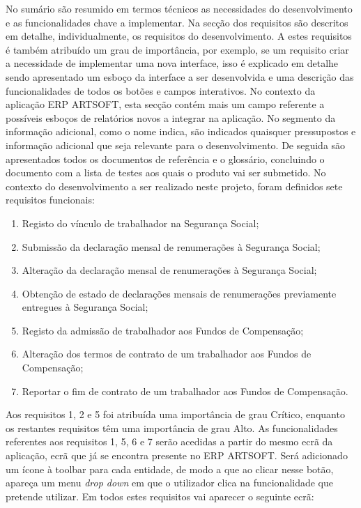 \documentclass[sigplan]{acmart}
\begin{document}
No sumário são resumido em termos técnicos as necessidades do desenvolvimento e as funcionalidades chave a implementar. Na secção dos requisitos são descritos em detalhe, individualmente, os requisitos do desenvolvimento. A estes requisitos é também atribuído um grau de importância, por exemplo, se um requisito criar a necessidade de implementar uma nova interface, isso é explicado em detalhe sendo apresentado um esboço da interface a ser desenvolvida e uma descrição das funcionalidades de todos os botões e campos interativos. No contexto da aplicação ERP ARTSOFT, esta secção contém mais um campo referente a possíveis esboços de relatórios novos a integrar na aplicação. No segmento da informação adicional, como o nome indica, são indicados quaisquer pressupostos e informação adicional que seja relevante para o desenvolvimento. De seguida são apresentados todos os documentos de referência e o glossário, concluindo o documento com a lista de testes aos quais o produto vai ser submetido. No contexto do desenvolvimento a ser realizado neste projeto, foram definidos sete requisitos funcionais:
\begin{enumerate}
  \item Registo do vínculo de trabalhador na Segurança Social;
  \item Submissão da declaração mensal de renumerações à Segurança Social;
  \item Alteração da declaração mensal de renumerações à Segurança Social;
  \item Obtenção de estado de declarações mensais de renumerações previamente entregues à Segurança Social;
  \item Registo da admissão de trabalhador aos Fundos de Compensação;
  \item Alteração dos termos de contrato de um trabalhador aos Fundos de Compensação;
  \item Reportar o fim de contrato de um trabalhador aos Fundos de Compensação.
\end{enumerate}
Aos requisitos 1, 2 e 5 foi atribuída uma importância de grau Crítico, enquanto os restantes requisitos têm uma importância de grau Alto. As funcionalidades referentes aos requisitos 1, 5, 6 e 7 serão acedidas a partir do mesmo ecrã da aplicação, ecrã que já se encontra presente no ERP ARTSOFT. Será adicionado um ícone à toolbar para cada entidade, de modo a que ao clicar nesse botão, apareça um menu \textit{drop down} em que o utilizador clica na funcionalidade que pretende utilizar. Em todos estes requisitos vai aparecer o seguinte ecrã:
\end{document}
